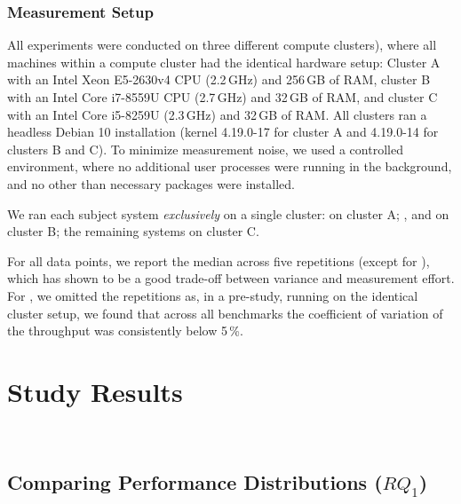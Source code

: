 {\subsubsection{Measurement Setup}\label{sec:measurement_setup}
All experiments were conducted on three different compute clusters), where all machines within a compute cluster had the identical hardware setup: Cluster \textsf{A} with an Intel Xeon E5-2630v4 CPU (2.2\,GHz) and 256\,GB of RAM, cluster \textsf{B}  with an Intel Core i7-8559U CPU (2.7\,GHz) and 32\,GB of RAM, and cluster \textsf{C} with an Intel Core i5-8259U (2.3\,GHz) and 32\,GB of RAM. All clusters ran a headless Debian 10 installation (kernel 4.19.0-17 for cluster \textsf{A} and 4.19.0-14 for clusters \textsf{B} and \textsf{C}). To minimize measurement noise, we used a controlled environment, where no additional user processes were running in the background, and no other than necessary packages were installed. 

We ran each subject system \textit{exclusively} on a single cluster: \htwo on cluster \textsf{A}; \dconvert, \batik and \jadx on cluster \textsf{B}; the remaining systems on cluster \textsf{C}.

For all data points, we report the median across five repetitions (except for \htwo), which has shown to be a good trade-off between variance and measurement effort. For \htwo, we omitted the repetitions as, in a pre-study, running on the identical cluster setup, we found that across all benchmarks the coefficient of variation of the throughput was consistently below 5\,\%.



\section{Study Results}~\label{sec:results}
\subsection{Comparing Performance Distributions ($RQ_1$)}\label{sec:rq1}
}
